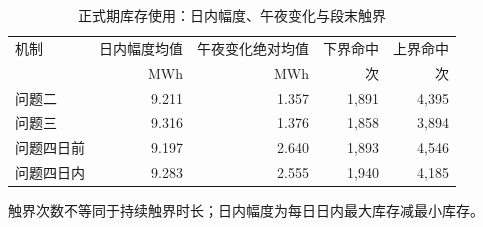 \begin{table}[H]\centering\small
\caption{正式期库存使用：日内幅度、午夜变化与段末触界}\label{tab:inventorymetrics}
\begin{tabular}{lrrrr}\toprule
机制&日内幅度均值&午夜变化绝对均值&下界命中&上界命中\\
& MWh & MWh & 次 & 次\\\midrule
问题二&9.211&1.357&1,891&4,395\\
问题三&9.316&1.376&1,858&3,894\\
问题四日前&9.197&2.640&1,893&4,546\\
问题四日内&9.283&2.555&1,940&4,185\\
\bottomrule\end{tabular}
\par\footnotesize 触界次数不等同于持续触界时长；日内幅度为每日日内最大库存减最小库存。
\end{table}
